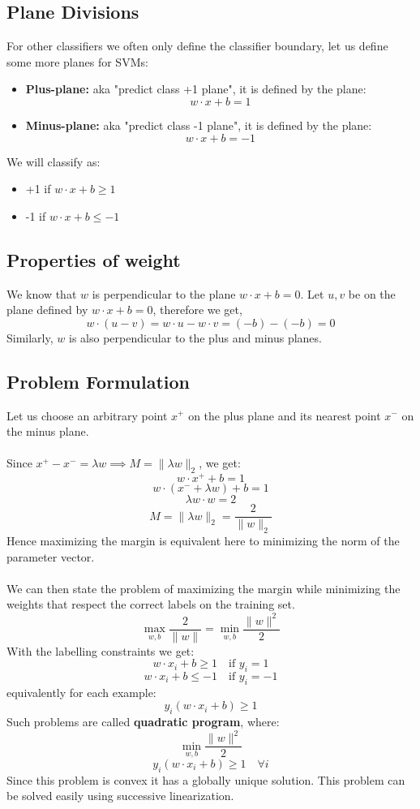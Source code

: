 \documentclass[12pt, a4paper]{book}
\begin{document}
\subsection{Plane Divisions}
For other classifiers we often only define the classifier boundary, let us define some more planes for SVMs:
\begin{itemize}
    \item \textbf{Plus-plane:} aka "predict class +1 plane", it is defined by the plane:
    $$w\cdot x + b = 1$$
    \item \textbf{Minus-plane:} aka "predict class -1 plane", it is defined by the plane:
    $$w\cdot x + b = -1$$
\end{itemize}
We will classify as:
\begin{itemize}
    \item +1 if $w\cdot x + b \geq 1$
    \item -1 if $w\cdot x + b \leq -1$
\end{itemize}

\subsection{Properties of weight}
We know that $w$ is perpendicular to the plane $w\cdot x+b=0$. Let $u, v$ be on the plane defined by $w\cdot x+b=0$, therefore we get,
$$w\cdot(u - v)=w\cdot u - w\cdot v= (-b) - (-b) = 0$$
Similarly, $w$ is also perpendicular to the plus and minus planes.

\subsection{Problem Formulation}
Let us choose an arbitrary point $x^+$ on the plus plane and its nearest point $x^-$ on the minus plane.\\\\
Since $x^+-x^- = \lambda w \implies M = \|\lambda w\|_2$, we get:
$$w\cdot x^+ + b = 1$$
$$w\cdot(x^- + \lambda w) + b = 1$$
$$\lambda w\cdot w = 2$$
$$M = \|\lambda w\|_2 = \frac{2}{\|w\|_2}$$
Hence maximizing the margin is equivalent here to minimizing the norm of the parameter vector.\\\\
We can then state the problem of maximizing the margin while minimizing the weights that respect the correct labels on the training set.
$$\max_{w,b}\frac{2}{\|w\|} = \min_{w,b}\frac{\|w\|^2}{2}$$
With the labelling constraints we get:
$$w\cdot x_i +b \geq 1 \quad \text{if $y_i =1$}$$
$$w\cdot x_i +b \leq -1 \quad \text{if $y_i =-1$}$$
equivalently for each example:
$$y_i(w\cdot x_i +b) \geq 1$$
Such problems are called \textbf{quadratic program}, where:
$$\min_{w,b}\frac{\|w\|^2}{2}$$
$$y_i(w\cdot x_i +b) \geq 1 \quad \forall i$$
Since this problem is convex it has a globally unique solution. This problem can be solved easily using successive linearization.
\end{document}

